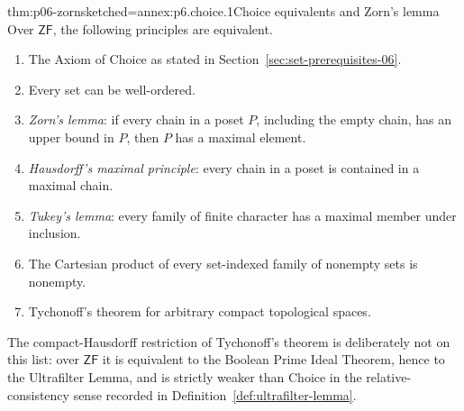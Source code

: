 \begin{hbtheorem}{thm:p06-zorn}{sketched=annex:p6.choice.1}{Choice equivalents and Zorn's lemma}
Over \(\mathsf{ZF}\), the following principles are equivalent.
\begin{enumerate}
  \item The Axiom of Choice as stated in
        Section~\ref{sec:set-prerequisites-06}.
  \item Every set can be well-ordered.
  \item \emph{Zorn's lemma}: if every chain in a poset \(P\), including the
        empty chain, has an upper bound in \(P\), then \(P\) has a maximal
        element.
  \item \emph{Hausdorff's maximal principle}: every chain in a poset is
        contained in a maximal chain.
  \item \emph{Tukey's lemma}: every family of finite character has a maximal
        member under inclusion.
  \item The Cartesian product of every set-indexed family of nonempty sets is
        nonempty.
  \item Tychonoff's theorem for arbitrary compact topological spaces.
\end{enumerate}
The compact-Hausdorff restriction of Tychonoff's theorem is deliberately not
on this list: over \(\mathsf{ZF}\) it is equivalent to the Boolean Prime Ideal
Theorem, hence to the Ultrafilter Lemma, and is strictly weaker than Choice in
the relative-consistency sense recorded in
Definition~\ref{def:ultrafilter-lemma}.
\end{hbtheorem}

